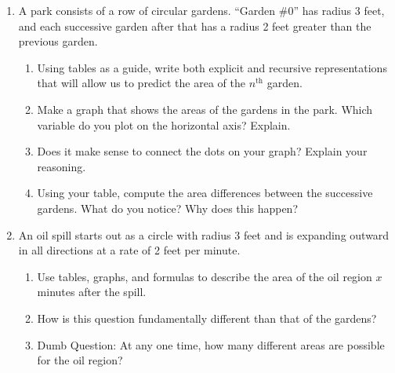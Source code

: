 \newpage
\begin{problems}
\begin{enumerate}

\item A park consists of a row of circular gardens.  ``Garden \#0'' has radius 3 feet, and each successive garden after that has a radius 2 feet greater than the previous garden.  
\begin{enumerate}
\item Using tables as a guide, write both explicit and recursive representations that will allow us to predict the area of the $n^\mathrm{th}$ garden.
\item Make a graph that shows the areas of the gardens in the park.  Which variable do you plot on the horizontal axis?  Explain.  
\item Does it make sense to connect the dots on your graph?  Explain your reasoning.  
\item Using your table, compute the area differences between the successive gardens.  What do you notice?  Why does this happen?
\end{enumerate}
\item An oil spill starts out as a circle with radius 3 feet and is expanding outward in all directions at a rate of 2 feet per minute. 
\begin{enumerate}
\item Use tables, graphs, and formulas to describe the area of the oil region $x$ minutes after the spill.  
\item How is this question fundamentally different than that of the gardens?  
\item Dumb Question:  At any one time, how many different areas are possible for the oil region?
\end{enumerate}



\end{enumerate}
\end{problems}

